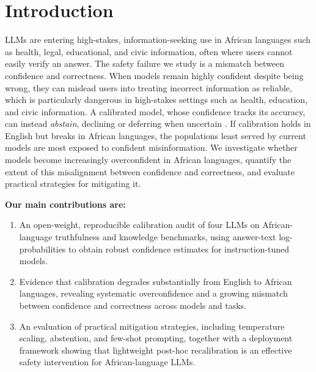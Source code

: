 \documentclass[11pt]{article}
\begin{document}
\section{Introduction}
LLMs are entering high-stakes, information-seeking use in African languages such as health, legal,
educational, and civic information, often where users cannot easily verify an answer. The safety
failure we study is a mismatch between confidence and correctness. When models remain highly
confident despite being wrong, they can mislead users into treating incorrect information as
reliable, which is particularly dangerous in high-stakes settings such as health, education, and
civic information. A calibrated model, whose confidence tracks its accuracy, can instead
\emph{abstain}, declining or deferring when uncertain \cite{tomani2024}. If calibration holds in
English but breaks in African languages, the populations least served by current models are most
exposed to confident misinformation. We investigate whether models become increasingly overconfident
in African languages, quantify the extent of this misalignment between confidence and correctness,
and evaluate practical strategies for mitigating it.

\textbf{Our main contributions are:}
\begin{enumerate}\itemsep1pt
  \item An open-weight, reproducible calibration audit of four LLMs on African-language truthfulness
  and knowledge benchmarks, using answer-text log-probabilities to obtain robust confidence estimates
  for instruction-tuned models.

  \item Evidence that calibration degrades substantially from English to African languages, revealing
  systematic overconfidence and a growing mismatch between confidence and correctness across models
  and tasks.

  \item An evaluation of practical mitigation strategies, including temperature scaling, abstention,
  and few-shot prompting, together with a deployment framework showing that lightweight post-hoc
  recalibration is an effective safety intervention for African-language LLMs.
\end{enumerate}
\end{document}
